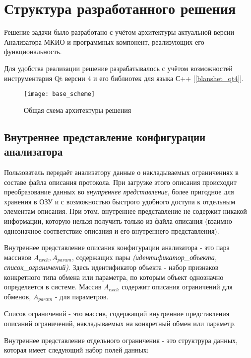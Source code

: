 \section{Структура разработанного решения}
\label{sec:struct}

Решение задачи было разработано с учётом архитектуры актуальной версии 
Анализатора МКИО и программных компонент, реализующих его функциональность.

Для удобства реализации решение разрабатывалось с учётом возможностей 
инструментария Qt версии 4 и его библиотек для языка С++ [\ref{blanshet_qt4}].

\begin{figure}[h]
\centering
\texttt{[image: base\_scheme]}
\caption{Общая схема архитектуры решения}
\label{figure:base_scheme}
\end{figure}

\subsection{Внутреннее представление конфигурации анализатора}
\label{subsec:inner}

Пользователь передаёт анализатору данные о накладываемых ограничениях в составе 
файла описания протокола. При загрузке этого описания происходит преобразование 
данных во \textit{внутреннее представление}, более пригодное для хранения в ОЗУ 
и с возможностью быстрого удобного доступа к отдельным элементам описания. При 
этом, внутреннее представление не содержит никакой информации, которую нельзя 
получить только из файла описания (взаимно однозначное соответствие описания и 
его внутреннего представления).

Внутреннее представление описания конфигурации анализатора - это пара массивов 
$A_{exch}, A_{param}$, содержащих пары \textit{(идентификатор\_объекта, 
список\_ограничений)}. Здесь идентификатор объекта - набор признаков 
конкретного типа обмена или параметра, по которым объект однозначно 
определяется в системе. Массив $A_{exch}$ содержит описания ограничений для 
обменов, $A_{param}$ - для параметров. 

Список ограничений - это массив, содержащий внутренние представления описаний 
ограничений, накладываемых на конкретный обмен или параметр. 

Внутреннее представление отдельного ограничения - это структрура данных, 
которая имеет следующий набор полей данных:

